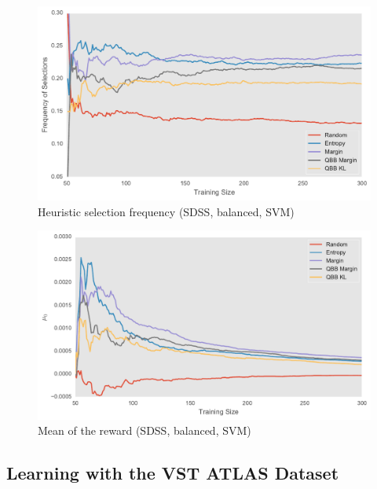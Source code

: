 \begin{figure}[p]
	\centering
	\includegraphics[width=\textwidth]{figures/5_thompson/sdss_ur_frequencies}
	\caption[Heuristic selection frequency (SDSS, unbalanced, SVM)]{
		Heuristic selection frequency (SDSS, balanced, SVM)}
	\label{fig:sdss_ur_frequencies}
\end{figure}

\begin{figure}[p]
	\centering
	\includegraphics[width=\textwidth]{figures/5_thompson/sdss_ur_mus}
	\caption[Mean of the reward (SDSS, unbalanced, SVM)]{
		Mean of the reward (SDSS, balanced, SVM)}
\end{figure}



\clearpage
\subsection{Learning with the VST ATLAS Dataset}

